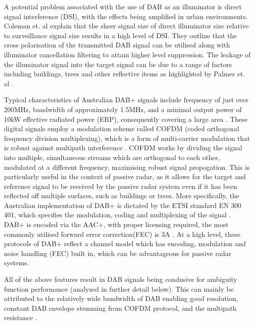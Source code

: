 \par \vspace{0.5cm} 
\noindent A potential problem associated with the use of DAB as an illuminator is direct signal interference (DSI), with the effects being amplified in urban environments. Coleman et. al \cite{DABfeatures} explain that the sheer signal size of direct illuminator size relative to surveillance signal size results in a high level of DSI. They outline that the cross polarisation of the transmitted DAB signal can be utilised along with illuminator cancellation filtering to attain higher level suppression. The leakage of the illuminator signal into the target signal can be due to a range of factors including buildings, trees and other reflective items as highlighted by Palmer et. al \cite{DTSO2009}.

\par \vspace{0.5cm} 
\noindent Typical characteristics of Australian DAB+ signals include frequency of just over 200MHz, bandwidth of approximately 1.5MHz, and a minimal output power of 10kW effective radiated power (ERP), consequently covering a large area \cite{DABfeatures}. These digital signals employ a modulation scheme called COFDM (coded orthogonal frequency division multiplexing), which is a form of multi-carrier modulation that is robust against multipath interference \cite{INTRO2017}. COFDM works by dividing the signal into multiple, simultaneous streams which are orthogonal to each other, modulated at a different frequency, maximising robust signal propogation. This is particularly useful in the context of passive radar, as it allows for the target and reference signal to be received by the passive radar system even if it has been reflected off multiple surfaces, such as buildings or trees. More specifically, the Australian implementation of DAB+ is dictated by the ETSI standard EN 300 401, which specifies the modulation, coding and multiplexing of the signal \cite{etsi_DAB_standard}. DAB+ is encoded via the AAC+, with proper licensing required, the most commonly utilised forward error correction(FEC) is 3A \cite{DABaustralia}. At a high level, these protocols of DAB+ reflect a channel model which has encoding, modulation and noise handling (FEC) built in, which can be advantageous for passive radar systems.


\par \vspace{0.5cm} 
\noindent All of the above features result in DAB signals being condusive for ambiguity function performance (analyzed in further detail below). This can mainly be attributed to the relatively wide bandwidth of DAB enabling good resolution, constant DAB envelope stemming from COFDM protocol, and the multipath resistance \cite{DABambiguity}.




